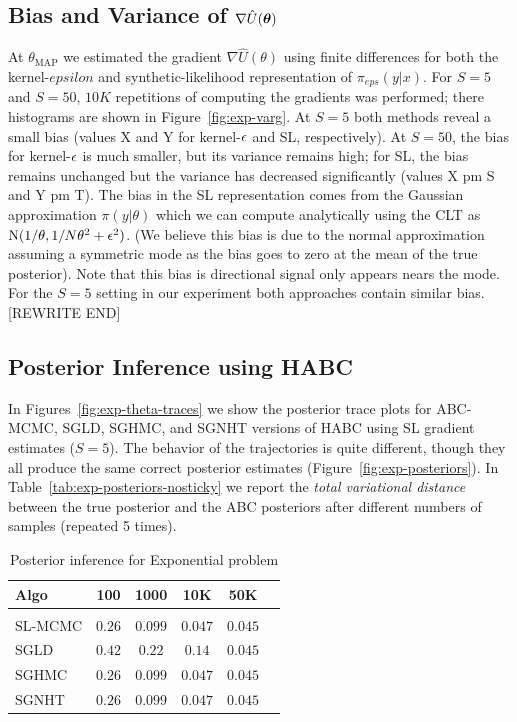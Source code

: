 \documentclass[]{article}
\begin{document}
\subsection{Bias and Variance of $\nabla \hat{U}({\bm \theta})$}
At $\theta_{\text{MAP}}$ we estimated the gradient $\nabla \hat{U}(\theta)$ using finite differences for both the kernel-$epsilon$ and synthetic-likelihood representation of $\pi_{eps}(y | x )$.  For $S=5$ and $S=50$, $10K$ repetitions of computing the gradients was performed; there histograms are shown in Figure~\ref{fig:exp-varg}.  At $S=5$ both methods reveal a small bias (values X and Y for kernel-$\epsilon$ and SL, respectively).  At $S=50$, the bias for kernel-$\epsilon$ is much smaller, but its variance remains high; for SL, the bias remains unchanged but the variance has decreased significantly (values X pm S and Y pm T). The bias in the SL representation comes from the Gaussian approximation $\pi(y|\theta)$ which we can compute analytically using the CLT as $\text{N}( 1/\theta, 1/N \theta^2 + \epsilon^2)$. 
(We believe this bias is due to the normal approximation assuming a symmetric mode as the bias goes to zero at the mean of the true posterior).  Note that this bias is directional signal only appears nears the mode.  For the $S=5$ setting in our experiment both approaches contain similar bias. [REWRITE END]




\subsection{Posterior Inference using HABC}
In Figures~\ref{fig:exp-theta-traces} we show the posterior trace plots for ABC-MCMC, SGLD, SGHMC, and SGNHT versions of HABC using SL gradient estimates ($S=5$).  The behavior of the trajectories is quite different, though they all produce the same correct posterior estimates (Figure~\ref{fig:exp-posteriors}).  In Table~\ref{tab:exp-posteriors-nosticky} we report the {\em total variational distance} between the true posterior and the ABC posteriors after different numbers of samples (repeated 5 times).

\begin{table}[h]
\caption{Posterior inference for Exponential problem}
\label{tab:exp-prob-no-sticky}
\begin{center}
\begin{tabular}{l||c|c|c|c|c}
{\bf Algo}  & 100 & 1000 & 10K & 50K \\
\hline \\
SL-MCMC &  $0.26$ & $0.099$ & $0.047$ & $0.045$ \\
SGLD    &  $0.42$ & $0.22$ & $0.14$ & $0.045$ \\
SGHMC   &  $0.26$ & $0.099$ & $0.047$ & $0.045$ \\
SGNHT   &  $0.26$ & $0.099$ & $0.047$ & $0.045$ \\
\end{tabular}
\end{center}
\end{table}
\end{document}
